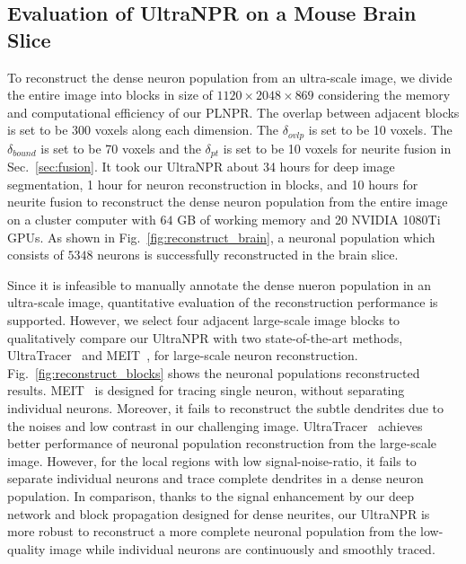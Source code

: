 \subsection{Evaluation of UltraNPR on a Mouse Brain Slice}
\label{sec:exp_UltraNPR}

To reconstruct the dense neuron population from an ultra-scale image, we divide the entire image into blocks in size of $1120\times 2048\times 869$ considering the memory and computational efficiency of our PLNPR.
%
The overlap between adjacent blocks is set to be $300$ voxels along each dimension. 
The $\delta_{ovlp}$ is set to be 10 voxels.
The $\delta_{bound}$ is set to be 70 voxels and the $\delta_{pt}$ is set to be 10 voxels for neurite fusion in Sec.~\ref{sec:fusion}.
%
It took our UltraNPR about 34 hours for deep image segmentation, 1 hour for neuron reconstruction in blocks, and 10 hours for neurite fusion to reconstruct the dense neuron population from the entire image on a cluster computer with $64$ GB of working memory and 20 NVIDIA 1080Ti GPUs.
%
As shown in Fig.~\ref{fig:reconstruct_brain}, a neuronal population which consists of $5348$ neurons is successfully reconstructed in the brain slice.


Since it is infeasible to manually annotate the dense nueron population in an ultra-scale image, quantitative evaluation of the reconstruction performance is supported.
%
However, we select four adjacent large-scale image blocks to qualitatively compare our UltraNPR with two state-of-the-art methods, UltraTracer~\cite{Peng2017} and MEIT~\cite{Wang2018}, for large-scale neuron reconstruction.
%
Fig.~\ref{fig:reconstruct_blocks} shows the neuronal populations reconstructed results.
%
MEIT~\cite{Wang2018} is designed for tracing single neuron, without separating individual neurons. 
Moreover, it fails to reconstruct the subtle dendrites due to the noises and low contrast in our challenging image.
%
% 
UltraTracer~\cite{Peng2017} achieves better performance of neuronal population reconstruction from the large-scale image. 
However, for the local regions with low signal-noise-ratio, it fails to separate individual neurons and trace complete dendrites in a dense neuron population. 
In comparison, thanks to the signal enhancement by our deep network and block propagation designed for dense neurites, our UltraNPR is more robust to reconstruct a more complete neuronal population from the low-quality image while individual neurons are continuously and smoothly traced.
 

